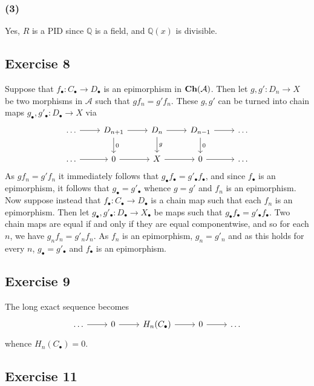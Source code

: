 \documentclass{article}
\theoremstyle{definition}
\newcommand{\Q}{\mathbb{Q}}
\newcommand{\catname}[1]{{\normalfont\textbf{#1}}}
\newcommand{\Ch}{\catname{Ch}}
\begin{document}
\subsubsection*{(3)}

Yes, $R$ is a PID since $\Q$ is a field, and $\Q(x)$ is divisible.

\subsection*{Exercise 8}

Suppose that $f_{\bullet} : C_{\bullet} \to D_{\bullet}$ is an epimorphism in
$\Ch(\mathcal{A})$. Then let $g, g' : D_n \to X$ be two morphisms in
$\mathcal{A}$ such that $gf_n = g'f_n$. These $g, g'$ can be turned into chain
maps $g_{\bullet}, g'_{\bullet} : D_{\bullet} \to X$ via 
\[
\begin{tikzcd}
	\ldots 
	\ar{r}
	& D_{n + 1}
	\ar{r}
	\ar{d}{0}
	& D_{n}
	\ar{r}
	\ar{d}{g}
	& D_{n - 1}
	\ar{r}
	\ar{d}{0}
	& \ldots \\
	\ldots 
	\ar{r}
	& 0
	\ar{r}
	& X
	\ar{r}
	& 0
	\ar{r}
	& \ldots
\end{tikzcd}
\] 
As $gf_n = g'f_n$ it immediately follows that $g_{\bullet} f_{\bullet} =
g'_{\bullet} f_{\bullet}$, and since $f_{\bullet}$ is an epimorphism, it
follows that $g_{\bullet} = g'_{\bullet}$ whence $g = g'$ and $f_n$ is an
epimorphism. \\

Now suppose instead that $f_{\bullet} : C_{\bullet} \to D_{\bullet}$ is a chain
map such that each $f_n$ is an epimorphism. Then let $g_{\bullet}, g'_{\bullet}
: D_{\bullet} \to X_{\bullet}$ be maps such that $g_{\bullet}f_{\bullet} =
g'_{\bullet}f_{\bullet}$. Two chain maps are equal if and only if they are
equal componentwise, and so for each $n$, we have $g_nf_n = g'_n f_n$.
As $f_n$ is an epimorphism, $g_n = g'_n$ and as this holds for every $n$,
$g_{\bullet} = g'_{\bullet}$ and $f_{\bullet}$ is an epimorphism.

\subsection*{Exercise 9}
The long exact sequence becomes 
\[
\begin{tikzcd}
	\ldots
	\ar{r}
	& 0
	\ar{r}
	& H_{n}(C_{\bullet})
	\ar{r}
	& 0
	\ar{r}
	& \ldots
\end{tikzcd}
\] 
whence $H_n(C_{\bullet}) = 0$.


\subsection*{Exercise 11}
\end{document}
